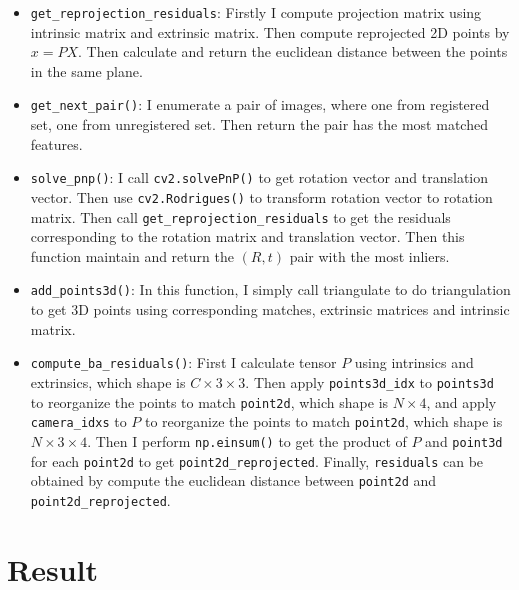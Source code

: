 \begin{itemize}
    \item \texttt{get\_reprojection\_residuals}: Firstly I compute projection matrix using intrinsic matrix and extrinsic matrix. Then compute reprojected 2D points by $x=PX$. Then calculate and return the euclidean distance between the points in the same plane.
    
    \item \texttt{get\_next\_pair()}: I enumerate a pair of images, where one from registered set, one from unregistered set. Then return the pair has the most matched features.
    
    \item \texttt{solve\_pnp()}: I call \texttt{cv2.solvePnP()} to get rotation vector and translation vector. Then use \texttt{cv2.Rodrigues()} to transform rotation vector to rotation matrix. Then call \texttt{get\_reprojection\_residuals} to get the residuals corresponding to the rotation matrix and translation vector. Then this function maintain and return the $(R, t)$ pair with the most inliers.
    
    \item \texttt{add\_points3d()}: In this function, I simply call triangulate to do triangulation to get 3D points using corresponding matches, extrinsic matrices and intrinsic matrix.
    
    \item \texttt{compute\_ba\_residuals()}: First I calculate tensor $P$ using intrinsics and extrinsics, which shape is $C\times 3 \times 3$. Then apply \texttt{points3d\_idx} to \texttt{points3d} to reorganize the points to match \texttt{point2d}, which shape is $N \times 4$, and apply \texttt{camera\_idxs} to $P$ to reorganize the points to match \texttt{point2d}, which shape is $N \times 3 \times 4$. Then I perform \texttt{np.einsum()} to get the product of $P$ and \texttt{point3d} for each \texttt{point2d} to get \texttt{point2d\_reprojected}. Finally, \texttt{residuals} can be obtained by compute the euclidean distance between \texttt{point2d} and \texttt{point2d\_reprojected}.
    
    

\end{itemize}

\section{Result}

